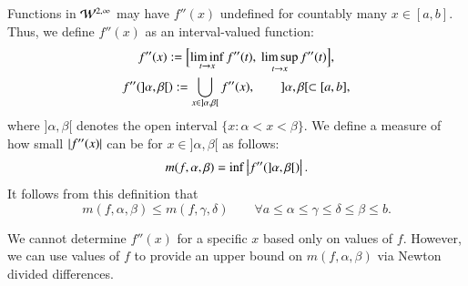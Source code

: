 \documentclass[review]{elsarticle}
\theoremstyle{definition}
\begin{document}
Functions in $\mathcal{W}^{2,\infty}$ may have $f''(x)$ undefined for countably many $x \in [a,b]$.  Thus, we define $f''(x)$ as an interval-valued function:
\begin{gather*}
f''(x) := \Bigl[\liminf_{t \to x} f''(t), \ \limsup_{t \to x} f''(t) \Bigr], \\
 f''(]\alpha, \beta[) := \bigcup_ {x \in ]\alpha, \beta[} f''(x), \qquad  ]\alpha, \beta[ \subset [a,b],
\end{gather*}
where $]\alpha, \beta[$ denotes the open interval  $\{x:\alpha<x<\beta\}$.
We define a
measure of how small $\left \lvert f''(x) \right \rvert$ can be for  $x \in ]\alpha, \beta[$ as follows:
\begin{equation} \label{minfppdef}
m(f,\alpha, \beta) = \inf \left \lvert f''(]\alpha, \beta[) \right \rvert.
\end{equation}
It follows from this definition
that
\begin{equation} \label{mdec}
m(f,\alpha,\beta) \le m(f,\gamma,\delta) \qquad \forall a \le \alpha \le \gamma \le \delta \le \beta \le b.
\end{equation}

We cannot determine $f''(x)$ for a specific $x$ based only on values of $f$. However,
we can use values of $f$ to provide an upper bound on $m(f,\alpha, \beta)$ via Newton divided differences.
\end{document}
